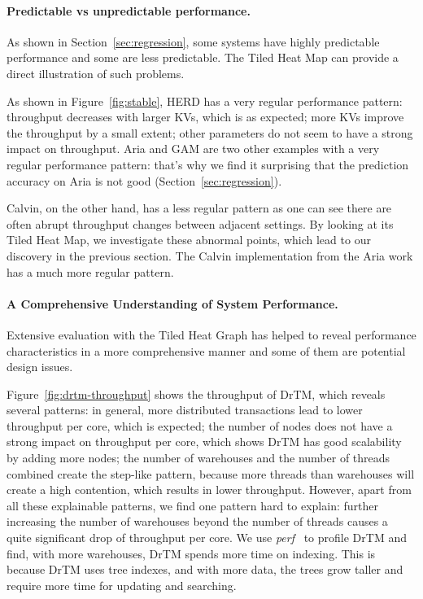 \vspace{-.1in}
\paragraph{Predictable vs unpredictable performance.}



As shown in Section~\ref{sec:regression}, some systems have highly predictable
performance and some are less predictable. The Tiled Heat Map can provide
a direct illustration of such problems.

As shown in Figure~\ref{fig:stable}, HERD has a very regular performance pattern:
throughput decreases with larger KVs, which is as expected; more KVs
improve the throughput by a small extent; other parameters do not seem
to have a strong impact on throughput. Aria and GAM are two other examples with
a very regular performance pattern: that's why we find it surprising
that the prediction accuracy on Aria is not good (Section~\ref{sec:regression}).

Calvin, on the other hand, has a
less regular pattern as one can see there are often abrupt throughput
changes between adjacent settings. By looking at its Tiled Heat Map, we investigate
these abnormal points, which lead to our discovery in the previous section. 
The Calvin implementation from the Aria work has a much more regular pattern.




\vspace{-.1in}
\paragraph{A Comprehensive Understanding of System Performance.}



Extensive evaluation with the Tiled Heat Graph
has helped to reveal performance characteristics in a more comprehensive manner and
some of them are potential design issues.

Figure~\ref{fig:drtm-throughput} shows the throughput of DrTM, which reveals
several patterns: in general, more distributed transactions lead to lower
throughput per core, which is expected; the number of nodes does not have a
strong impact on throughput per core, which shows DrTM has good scalability
by adding more nodes; the number of warehouses and the number of threads combined
create the step-like pattern, because more threads than warehouses will create
a high contention, which results in lower throughput. However, apart from all these
explainable patterns, we find one pattern hard to explain: further increasing the
number of warehouses beyond the number of threads causes a quite significant drop
of throughput per core.
We use \emph{perf}~\cite{perf} to profile DrTM and find, with more warehouses,
DrTM spends more time on indexing. This is because DrTM uses tree indexes, and
with more data, the trees grow taller and require more time for updating and searching.

